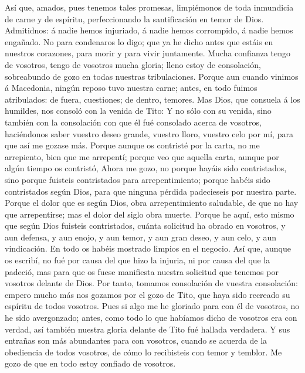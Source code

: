  Así que, amados, pues tenemos tales promesas, limpiémonos
de toda inmundicia de carne y de espíritu, perfeccionando la
santificación en temor de Dios.  Admitidnos: á nadie hemos
injuriado, á nadie hemos corrompido, á nadie hemos engañado.
 No para condenaros lo digo; que ya he dicho antes que
estáis en nuestros corazones, para morir y para vivir juntamente.
 Mucha confianza tengo de vosotros, tengo de vosotros
mucha gloria; lleno estoy de consolación, sobreabundo de gozo en todas
nuestras tribulaciones.  Porque aun cuando vinimos á
Macedonia, ningún reposo tuvo nuestra carne; antes, en todo fuimos
atribulados: de fuera, cuestiones; de dentro, temores. 
Mas Dios, que consuela á los humildes, nos consoló con la venida de
Tito:  Y no sólo con su venida, sino también con la
consolación con que él fué consolado acerca de vosotros, haciéndonos
saber vuestro deseo grande, vuestro lloro, vuestro celo por mí, para que
así me gozase más.  Porque aunque os contristé por la
carta, no me arrepiento, bien que me arrepentí; porque veo que aquella
carta, aunque por algún tiempo os contristó,  Ahora me
gozo, no porque hayáis sido contristados, sino porque fuisteis
contristados para arrepentimiento; porque habéis sido contristados según
Dios, para que ninguna pérdida padecieseis por nuestra parte.
 Porque el dolor que es según Dios, obra arrepentimiento
saludable, de que no hay que arrepentirse; mas el dolor del siglo obra
muerte.  Porque he aquí, esto mismo que según Dios
fuisteis contristados, cuánta solicitud ha obrado en vosotros, y aun
defensa, y aun enojo, y aun temor, y aun gran deseo, y aun celo, y aun
vindicación. En todo os habéis mostrado limpios en el negocio.
 Así que, aunque os escribí, no fué por causa del que
hizo la injuria, ni por causa del que la padeció, mas para que os fuese
manifiesta nuestra solicitud que tenemos por vosotros delante de Dios.
 Por tanto, tomamos consolación de vuestra consolación:
empero mucho más nos gozamos por el gozo de Tito, que haya sido recreado
su espíritu de todos vosotros.  Pues si algo me he
gloriado para con él de vosotros, no he sido avergonzado; antes, como
todo lo que habíamos dicho de vosotros era con verdad, así también
nuestra gloria delante de Tito fué hallada verdadera.  Y
sus entrañas son más abundantes para con vosotros, cuando se acuerda de
la obediencia de todos vosotros, de cómo lo recibisteis con temor y
temblor.  Me gozo de que en todo estoy confiado de
vosotros.

